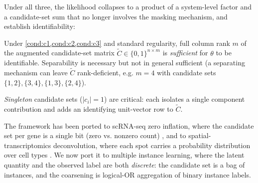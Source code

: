 Under all three, the likelihood collapses to a product of a
system-level factor and a candidate-set sum that no longer involves
the masking mechanism, and \citet[Theorem 8]{towell2026masked}
establish identifiability:

\begin{theorem}
\label{thm:bg-id}
Under \cref{cond:c1,cond:c2,cond:c3} and standard regularity, full
column rank $m$ of the augmented candidate-set matrix $\tilde{C}
\in \{0,1\}^{n \times m}$ is \emph{sufficient} for $\theta$ to be
identifiable. Separability is necessary but not in general
sufficient (a separating mechanism can leave $\tilde{C}$
rank-deficient, e.g. $m=4$ with candidate sets
$\{1,2\},\{3,4\},\{1,3\},\{2,4\}$).
\end{theorem}

\emph{Singleton} candidate sets ($|c_i|=1$) are critical: each
isolates a single component contribution and adds an identifying
unit-vector row to $\tilde{C}$.

The framework has been ported to scRNA-seq zero inflation, where the
candidate set per gene is a single bit (zero vs. nonzero count)
\citep{towell2026scrnacoarsening}, and to spatial-transcriptomics
deconvolution, where each spot carries a probability distribution
over cell types \citep{towell2026spatialcoarsening}. We now port it
to multiple instance learning, where the latent quantity and the
observed label are both \emph{discrete}: the candidate set is a bag
of instances, and the coarsening is logical-OR aggregation of binary
instance labels.
